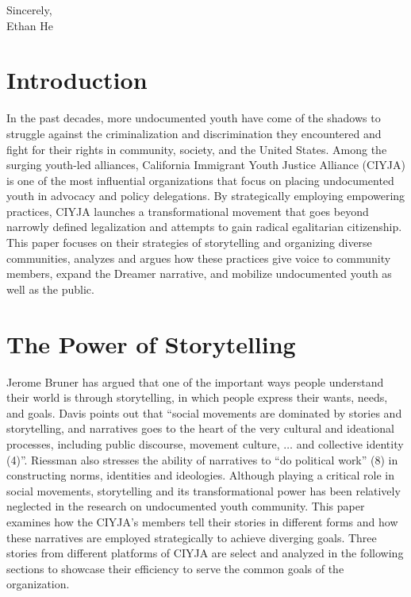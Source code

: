 \documentclass[12pt]{article}
\begin{document}
\begin{flushleft}
\noindent
Sincerely, \\
\noindent
Ethan He

\section{Introduction}

In the past decades, more undocumented youth have come of the shadows to struggle against the criminalization and discrimination they encountered and fight for their rights in community, society, and the United States. 
Among the surging youth-led alliances, California Immigrant Youth Justice Alliance (CIYJA) is one of the most influential organizations that focus on placing undocumented youth in advocacy and policy delegations. 
By strategically employing empowering practices, CIYJA launches a transformational movement that goes beyond narrowly defined legalization and attempts to gain radical egalitarian citizenship.
This paper focuses on their strategies of storytelling and organizing diverse communities, analyzes and argues how these practices give voice to community members, expand the Dreamer narrative, and mobilize undocumented youth as well as the public.

\section{The Power of Storytelling}

Jerome Bruner has argued that one of the important ways people understand their world is through storytelling, 
in which people express their wants, needs, and goals. %
Davis points out that ``social movements are dominated by stories and storytelling, and narratives goes to the heart of the very cultural and ideational processes, including public discourse, movement culture, $\ldots$ and collective identity (4)''. %
Riessman also stresses the ability of narratives to ``do political work'' (8) in constructing norms, identities and ideologies. %
Although playing a critical role in social movements, storytelling and its transformational power has been relatively neglected in the research on undocumented youth community. 
This paper examines how the CIYJA's members tell their stories in different forms and how these narratives are employed strategically to achieve diverging goals. 
Three stories from different platforms of CIYJA are select and analyzed in the following sections to showcase their efficiency to serve the common goals of the organization.


\end{flushleft}
\end{document}
